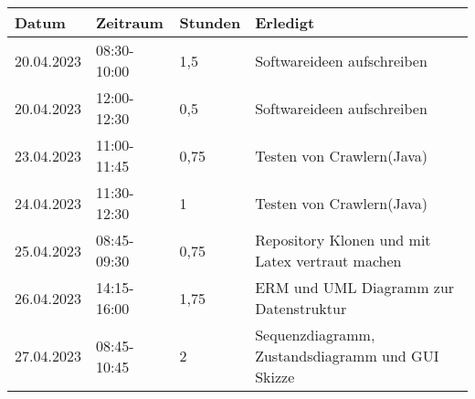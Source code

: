 \begin{tabular}{|l|l|l|l|}
\hline
Datum & Zeitraum & Stunden & Erledigt \\
\hline
    20.04.2023 & 08:30-10:00 & 1,5 & Softwareideen aufschreiben\\
    20.04.2023 & 12:00-12:30 & 0,5 & Softwareideen aufschreiben\\
    23.04.2023 & 11:00-11:45 & 0,75 & Testen von Crawlern(Java)\\
    24.04.2023 & 11:30-12:30 & 1 & Testen von Crawlern(Java)\\
    25.04.2023 & 08:45-09:30 & 0,75 & Repository Klonen und mit Latex vertraut machen\\
    26.04.2023 & 14:15-16:00 & 1,75 & ERM und UML Diagramm zur Datenstruktur\\
    27.04.2023 & 08:45-10:45 & 2 & Sequenzdiagramm, Zustandsdiagramm und GUI Skizze\\
\hline
\end{tabular}